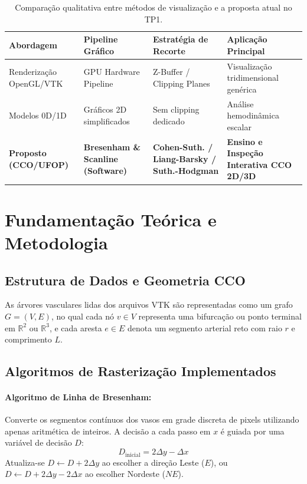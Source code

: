 \documentclass[11pt, a4paper]{article}
\begin{document}
\begin{table}[htbp]
  \centering
  \small
  \caption{Comparação qualitativa entre métodos de visualização e a proposta atual no TP1.}
  \label{tab:relacionados}
  \begin{tabularx}{\textwidth}{l X X X}
    \toprule
    \textbf{Abordagem} & \textbf{Pipeline Gráfico} & \textbf{Estratégia de Recorte} & \textbf{Aplicação Principal} \\
    \midrule
    Renderização OpenGL/VTK & GPU Hardware Pipeline & Z-Buffer / Clipping Planes & Visualização tridimensional genérica \\
    Modelos 0D/1D & Gráficos 2D simplificados & Sem clipping dedicado & Análise hemodinâmica escalar \\
    \textbf{Proposto (CCO/UFOP)} & \textbf{Bresenham \& Scanline (Software)} & \textbf{Cohen-Suth. / Liang-Barsky / Suth.-Hodgman} & \textbf{Ensino e Inspeção Interativa CCO 2D/3D} \\
    \bottomrule
  \end{tabularx}
\end{table}

\section{Fundamentação Teórica e Metodologia}

\subsection{Estrutura de Dados e Geometria CCO}
As árvores vasculares lidas dos arquivos VTK são representadas como um grafo $G = (V, E)$, no qual cada nó $v \in V$ representa uma bifurcação ou ponto terminal em $\mathbb{R}^2$ ou $\mathbb{R}^3$, e cada aresta $e \in E$ denota um segmento arterial reto com raio $r$ e comprimento $L$.

\subsection{Algoritmos de Rasterização Implementados}
\paragraph{Algoritmo de Linha de Bresenham:}
Converte os segmentos contínuos dos vasos em grade discreta de pixels utilizando apenas aritmética de inteiros. A decisão a cada passo em $x$ é guiada por uma variável de decisão $D$:
\begin{equation}
  D_{\text{inicial}} = 2\Delta y - \Delta x
  \label{eq:bresenham}
\end{equation}
Atualiza-se $D \leftarrow D + 2\Delta y$ ao escolher a direção Leste ($E$), ou $D \leftarrow D + 2\Delta y - 2\Delta x$ ao escolher Nordeste ($NE$).
\end{document}
